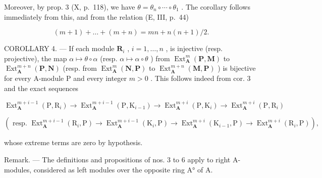 Moreover, by prop. 3 (X, p.~118), we have \(\theta = \theta_{n} \circ \cdots \circ \theta_{1}\) . The corollary follows immediately from this, and from the relation (E, III, p.~44)

\[
(m + 1) + \dots + (m + n) = m n + n (n + 1) / 2.
\]

COROLLARY 4. --- If each module \(\mathbf{R}_i\) , \(i = 1, \ldots, n\) , is injective (resp. projective), the map \(\alpha \mapsto \theta \circ \alpha\) (resp. \(\alpha \mapsto \alpha \circ \theta\) ) from \(\operatorname{Ext}_{\mathbf{A}}^{m}(\mathbf{P}, \mathbf{M})\) to \(\operatorname{Ext}_{\mathbf{A}}^{m+n}(\mathbf{P}, \mathbf{N})\) (resp. from \(\operatorname{Ext}_{\mathbf{A}}^{m}(\mathbf{N}, \mathbf{P})\) to \(\operatorname{Ext}_{\mathbf{A}}^{m+n}(\mathbf{M}, \mathbf{P})\) ) is bijective for every A-module P and every integer \(m > 0\) . This follows indeed from cor. 3 and the exact sequences

\[
\operatorname{Ext} _ {\mathbf {A}} ^ {m + i - 1} \left(\mathrm{P}, \mathrm{R} _ {i}\right)\rightarrow \operatorname{Ext} _ {\mathbf {A}} ^ {m + i - 1} \left(\mathrm{P}, \mathrm{K} _ {i - 1}\right)\rightarrow \operatorname{Ext} _ {\mathbf {A}} ^ {m + i} \left(\mathrm{P}, \mathrm{K} _ {i}\right)\rightarrow \operatorname{Ext} _ {\mathbf {A}} ^ {m + i} \left(\mathrm{P}, \mathrm{R} _ {i}\right)
\]

\[
\left(\text { resp. } \operatorname{Ext} _ {\mathbf {A}} ^ {m + i - 1} \left(\mathrm{R} _ {i}, \mathrm{P}\right)\rightarrow \operatorname{Ext} _ {\mathbf {A}} ^ {m + i - 1} \left(\mathrm{K} _ {i}, \mathrm{P}\right)\rightarrow \operatorname{Ext} _ {\mathbf {A}} ^ {m + i} \left(\mathrm{K} _ {i - 1}, \mathrm{P}\right)\rightarrow \operatorname{Ext} _ {\mathbf {A}} ^ {m + i} \left(\mathrm{R} _ {i}, \mathrm{P}\right)\right),
\]

whose extreme terms are zero by hypothesis.

Remark. --- The definitions and propositions of nos. 3 to 6 apply to right A-modules, considered as left modules over the opposite ring A° of A.

